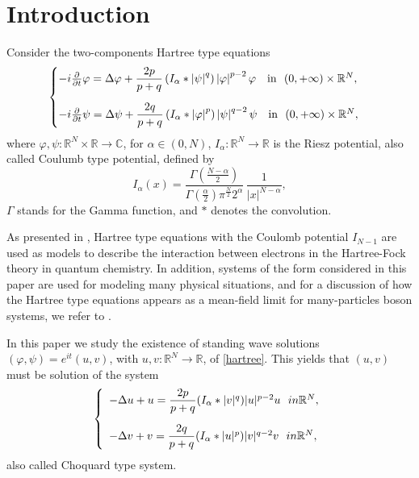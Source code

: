 \documentclass[12pt,a4paper]{article}
\numberwithin{equation}{section}
\begin{document}
\section{Introduction}			
Consider the two-components Hartree type equations
\begin{equation}\label{hartree}
\begin{cases}
-i \frac{\partial}{\partial t} \varphi =\Delta \varphi + \dfrac{2p}{p+q}\left(I_{\alpha} \ast\left|\psi\right|^q\right)\left|\varphi\right|^{p-2} \varphi \quad \text{in} \ \ (0, +\infty) \times \mathbb{R}^N, \vspace{10pt}\\
-i \frac{\partial}{\partial t} \psi =\Delta \psi + \dfrac{2q}{p+q}\left(I_{\alpha} \ast\left|\varphi\right|^p\right)\left|\psi\right|^{q-2} \psi \quad \text{in} \ \ (0, +\infty) \times \mathbb{R}^N, 
\end{cases}
\end{equation}
where $\varphi,\psi: \mathbb{R}^N \times \mathbb{R} \rightarrow \mathbb{C}$, for $\alpha\in (0, N)$,  $I_\alpha:\mathbb{R}^N \rightarrow \mathbb{R}$ is the Riesz potential, also called Coulumb type potential, defined by
$$
I_\alpha(x)=\dfrac{\Gamma\left(\frac{N-\alpha}{2}\right)}{\Gamma\left(\frac{\alpha}{2}\right)\pi^{\frac{N}{2}}2^\alpha}\,\dfrac{1}{|x|^{N-\alpha}},
$$
$\Gamma$ stands for the Gamma function, and $\ast$ denotes the convolution. 

As presented in \cite{Lieb-Simon, Lions-Hartree, BBL}, Hartree type equations with the Coulomb potential $I_{N-1}$ are used as models to describe the interaction between electrons in the Hartree-Fock theory in quantum chemistry. In addition, systems of the form considered in this paper are used for modeling many physical situations, and for a discussion of how the Hartree type equations appears as a mean-field limit for many-particles boson systems, we refer to \cite{seminaire, lewin}. 

In this paper we study the existence of standing wave solutions $(\varphi, \psi) = e^{it}(u,v)$, with $u,v: \mathbb{R}^N \to \mathbb{R}$, of \eqref{hartree}. This yields that $(u,v)$ must be solution of the system
\begin{equation}\label{P}
\left\{ \begin{array}{ll}
-\Delta u + u = \dfrac{2p}{p+q}(I_\alpha \ast |v|^{q})|u|^{p-2}u \ \ \textrm{ in } \mathbb{R}^N, \vspace{10pt}\\
-\Delta v + v = \dfrac{2q}{p+q}(I_\alpha \ast |u|^{p})|v|^{q-2}v \ \ \textrm{ in } \mathbb{R}^N,
\end{array} \right.
\end{equation}			
also called Choquard type system.
\end{document}
